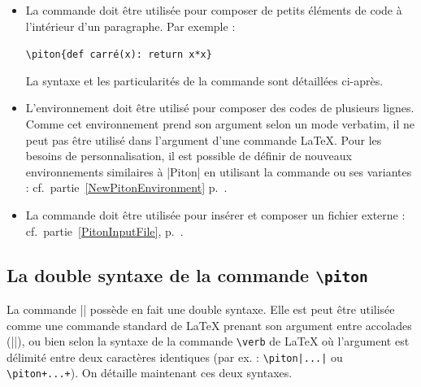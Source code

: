 \documentclass[dvipsnames,svgnames]{article}
\begin{document}
\begin{itemize} 
\item La commande  doit être utilisée
pour composer de petits éléments de code à l'intérieur d'un paragraphe. Par exemple :

{\color{gray}\verb|\piton{def carré(x): return x*x}|}\qquad 
{}

La syntaxe et les particularités de la commande sont détaillées ci-après.


\item L'environnement  doit être utilisé pour composer des
codes de plusieurs lignes. Comme cet environnement prend son argument selon un
mode verbatim, il ne peut pas être utilisé dans l'argument d'une commande LaTeX.
Pour les besoins de personnalisation, il est possible de définir de nouveaux
environnements similaires à |{Piton}| en utilisant la commande
 ou ses variantes :
cf.~partie~\ref{NewPitonEnvironment} p.~\pageref{NewPitonEnvironment}.

\item La commande  doit être utilisée pour insérer et
composer un fichier externe : cf.~partie~\ref{PitonInputFile},
p.~\pageref{PitonInputFile}.
\end{itemize}


\subsection{La double syntaxe de la commande \texttt{\textbackslash piton}}


La commande |\piton| possède en fait une double syntaxe. Elle est peut être utilisée comme
une commande standard de LaTeX prenant son argument entre accolades (||), ou
bien selon la syntaxe de la commande
\texttt{\textbackslash verb} de LaTeX où l'argument est délimité entre deux caractères 
identiques (par ex. : \verb!\piton|...|! ou \verb!\piton+...+!).
On détaille maintenant ces deux syntaxes.
\end{document}
